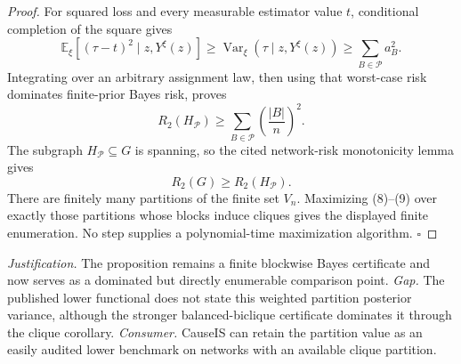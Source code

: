 \documentclass{article}
\begin{document}
\begin{proof}
For squared loss and every measurable estimator value \(t\), conditional completion of the square gives
\[
\mathbb E_{\xi}[(\tau-t)^2\mid z,Y^{\xi}(z)]
\geq\operatorname{Var}_{\xi}(\tau\mid z,Y^{\xi}(z))
\geq\sum_{B\in\mathcal P}a_B^2.
\tag{7}
\]
Integrating over an arbitrary assignment law, then using that worst-case risk dominates finite-prior Bayes risk, proves
\[
R_2(H_{\mathcal P})\geq
\sum_{B\in\mathcal P}\left(\frac{|B|}{n}\right)^2.
\tag{8}
\]
The subgraph \(H_{\mathcal P}\subseteq G\) is spanning, so the cited network-risk monotonicity lemma gives
\[
R_2(G)\geq R_2(H_{\mathcal P}).
\tag{9}
\]
There are finitely many partitions of the finite set \(V_n\).  Maximizing (8)--(9) over exactly those partitions whose blocks induce cliques gives the displayed finite enumeration.  No step supplies a polynomial-time maximization algorithm. \(\square\)
\end{proof}
\par\smallskip\noindent \textit{Justification.} The proposition remains a finite blockwise Bayes certificate and now serves as a dominated but directly enumerable comparison point. \textit{Gap.} The published lower functional does not state this weighted partition posterior variance, although the stronger balanced-biclique certificate dominates it through the clique corollary. \textit{Consumer.} CauseIS can retain the partition value as an easily audited lower benchmark on networks with an available clique partition.
\end{document}
